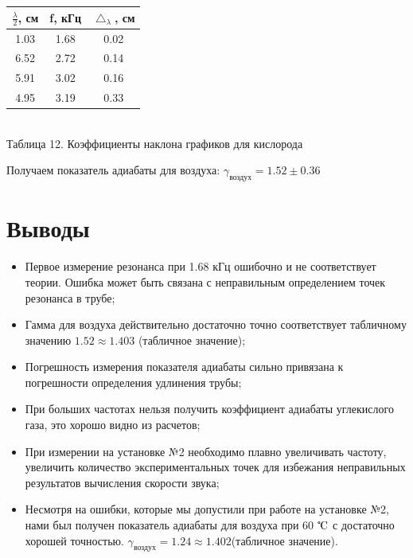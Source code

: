 \documentclass[a4paper, 12pt]{article}
\begin{document}
\begin{center}
	\begin{tabular} {|c | c |c |}
		\hline	
		$\frac{\lambda}{2}$, см & f, кГц & $\bigtriangleup_{\lambda}$, см \\
		\hline
		1.03& 1.68& 0.02\\
		\hline
		6.52& 2.72& 0.14\\
		\hline
		5.91& 3.02& 0.16\\
		\hline
		4.95& 3.19& 0.33\\
		\hline
		
	\end{tabular}\\
	Таблица 12. Коэффициенты наклона графиков для кислорода 
\end{center}

	Получаем показатель адиабаты для воздуха:
	$\gamma_{\text{воздух}} = 1.52 \pm 0.36 $

	
	\section{Выводы}
	\begin{itemize}
		\item Первое измерение резонанса при 1.68 кГц ошибочно и не соответствует теории. Ошибка может быть связана с неправильным определением точек резонанса в трубе;
		\item Гамма для воздуха действительно достаточно точно соответствует табличному значению $1.52\approx 1.403$ (табличное значение);
		\item Погрешность измерения показателя адиабаты сильно привязана к погрешности определения удлинения трубы;
		\item При больших частотах нельзя получить коэффициент адиабаты углекислого газа, это хорошо видно из расчетов;
		\item При измерении на установке №2 необходимо плавно увеличивать частоту, увеличить количество экспериментальных точек для избежания неправильных результатов вычисления скорости звука;
		\item Несмотря на ошибки, которые мы допустили при работе на установке №2, нами был получен показатель адиабаты для воздуха при 60 $\tccelsius$ с достаточно хорошей точностью. $\gamma_{\text{воздух}} = 1.24 \approx 1.402$(табличное значение).
\end{itemize}
	
\end{document}
